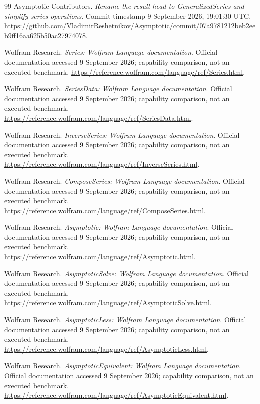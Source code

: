 \begin{thebibliography}{99}
Asymptotic Contributors. \emph{Rename the result head to GeneralizedSeries and simplify series operations}. Commit timestamp 9 September 2026, 19:01:30 UTC.
\url{https://github.com/VladimirReshetnikov/Asymptotic/commit/07a9781212beb2eeb9ff16aa625b50ac27974078}.

Wolfram Research. \emph{Series: Wolfram Language documentation}. Official documentation accessed 9 September 2026; capability comparison, not an executed benchmark.
\url{https://reference.wolfram.com/language/ref/Series.html}.

Wolfram Research. \emph{SeriesData: Wolfram Language documentation}. Official documentation accessed 9 September 2026; capability comparison, not an executed benchmark.
\url{https://reference.wolfram.com/language/ref/SeriesData.html}.

Wolfram Research. \emph{InverseSeries: Wolfram Language documentation}. Official documentation accessed 9 September 2026; capability comparison, not an executed benchmark.
\url{https://reference.wolfram.com/language/ref/InverseSeries.html}.

Wolfram Research. \emph{ComposeSeries: Wolfram Language documentation}. Official documentation accessed 9 September 2026; capability comparison, not an executed benchmark.
\url{https://reference.wolfram.com/language/ref/ComposeSeries.html}.

Wolfram Research. \emph{Asymptotic: Wolfram Language documentation}. Official documentation accessed 9 September 2026; capability comparison, not an executed benchmark.
\url{https://reference.wolfram.com/language/ref/Asymptotic.html}.

Wolfram Research. \emph{AsymptoticSolve: Wolfram Language documentation}. Official documentation accessed 9 September 2026; capability comparison, not an executed benchmark.
\url{https://reference.wolfram.com/language/ref/AsymptoticSolve.html}.

Wolfram Research. \emph{AsymptoticLess: Wolfram Language documentation}. Official documentation accessed 9 September 2026; capability comparison, not an executed benchmark.
\url{https://reference.wolfram.com/language/ref/AsymptoticLess.html}.

Wolfram Research. \emph{AsymptoticEquivalent: Wolfram Language documentation}. Official documentation accessed 9 September 2026; capability comparison, not an executed benchmark.
\url{https://reference.wolfram.com/language/ref/AsymptoticEquivalent.html}.


\end{thebibliography}
